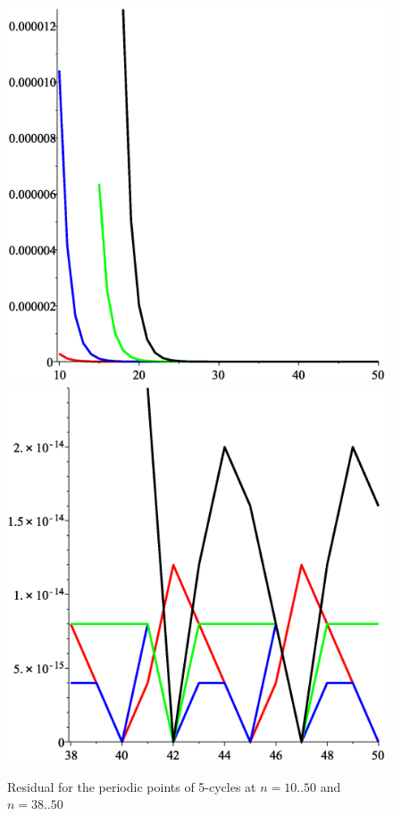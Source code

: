 \documentclass[12pt,a4paper]{amsart}
\begin{document}
\begin{figure}[h!]
\centering
\includegraphics[scale=0.28]{Fig5a}
\hspace{1cm}
\includegraphics[scale=0.28]{Fig5b}
\caption{Residual for the periodic points of 5-cycles at $n=10..50$ and $n=38..50$} \label{f5}
\end{figure}
\end{document}
